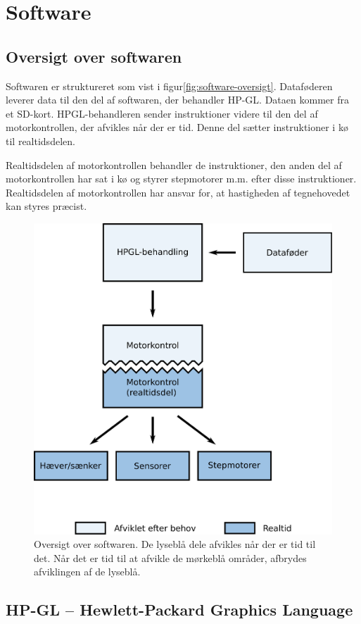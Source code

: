 \chapter{Software}



\section{Oversigt over softwaren}


Softwaren er struktureret som vist i
figur\vref{fig:software-oversigt}. Dataføderen leverer data til den
del af softwaren, der behandler HP-GL. Dataen kommer fra et
SD-kort. HPGL-behandleren sender instruktioner videre til den del af
motorkontrollen, der afvikles når der er tid. Denne del sætter
instruktioner i kø til realtidsdelen.

Realtidsdelen af motorkontrollen behandler de instruktioner, den anden
del af motorkontrollen har sat i kø og styrer stepmotorer m.m. efter
disse instruktioner. Realtidsdelen af motorkontrollen har ansvar for,
at hastigheden af tegnehovedet kan styres præcist.


\begin{figure}[htbp]
  \centering
  \includegraphics[width=.75\textwidth]{../brugere/kjaergaard/software-oversigt}
  \caption{Oversigt over softwaren. De lyseblå dele afvikles når der
    er tid til det. Når det er tid til at afvikle de mørkeblå områder,
    afbrydes afviklingen af de lyseblå.}
  \label{fig:software-oversigt}
\end{figure}


\section{HP-GL -- Hewlett-Packard Graphics Language}





